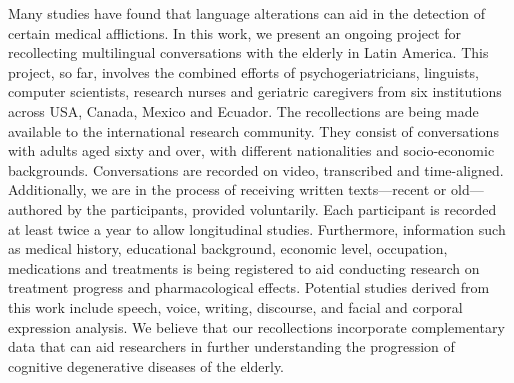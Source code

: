 Many studies have found that language alterations can aid in the detection of certain medical afflictions. In this work, we present an ongoing project for recollecting multilingual conversations with the elderly in Latin America. This project, so far, involves the combined efforts of psychogeriatricians, linguists, computer scientists, research nurses and geriatric caregivers from six institutions across USA, Canada, Mexico and Ecuador. The recollections are being made available to the international research community. They consist of conversations with adults aged sixty and over, with different nationalities and socio-economic backgrounds. Conversations are recorded on video, transcribed and time-aligned. Additionally, we are in the process of receiving written texts—recent or old—authored by the participants, provided voluntarily. Each participant is recorded at least twice a year to allow longitudinal studies. Furthermore, information such as medical history, educational background, economic level, occupation, medications and treatments is being registered to aid conducting research on treatment progress and pharmacological effects. Potential studies derived from this work include speech, voice, writing, discourse, and facial and corporal expression analysis. We believe that our recollections incorporate complementary data that can aid researchers in further understanding the progression of cognitive degenerative diseases of the elderly.
